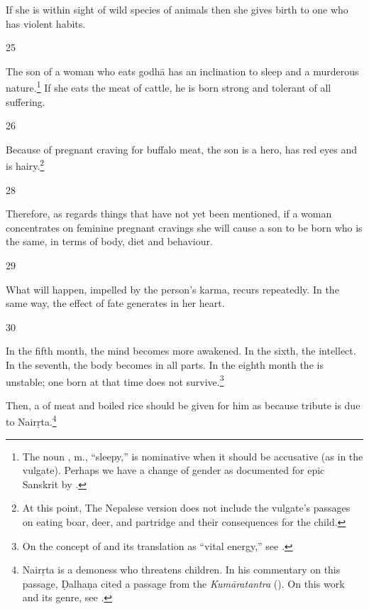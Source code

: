 \begin{translation}
If she is within sight of wild species of animals then she gives birth
to one who has violent habits.


\item [25]

The son of a woman who eats \gls{godhā} has an inclination to sleep
and a murderous nature.\footnote{The noun , m.,
    “sleepy,” is nominative when it should be accusative (as in the
    vulgate).  Perhaps we have a change of gender as documented for epic
    Sanskrit by \cite[xxxviii--xl, et passim]{ober-2003}.}  If she eats
    the meat of cattle, he is born strong and tolerant of all suffering.
    
\item [26] 
    
Because of pregnant craving for buffalo meat, the son is a hero, has red eyes and is 
hairy.\footnote{At this point, The Nepalese version does not include the vulgate's 
passages on eating boar, deer, and partridge and their consequences for the child.}

\item[28]

Therefore, as regards things that have not yet been mentioned, if a
woman concentrates on feminine  pregnant cravings she will cause a son to be 
born who is the same, in terms of body, diet and behaviour.

\item[29]

What will happen, impelled by the person's karma, recurs repeatedly.  In the same 
way, the effect of fate generates  in her heart. 

\item[30]

In the fifth month, the mind becomes more awakened. %
In the sixth, the intellect.  In the seventh, the body becomes
 in all parts. %
In the eighth month the  is unstable; one born
at that time does not survive.\footnote{On the concept of 
    and its translation as “vital energy,” see \cites[xl, et
    passim]{wuja-2003}[530--535]{das-2003}.} 

Then, a  of meat and boiled rice should be
given for him as  because tribute is due to
Nair\d{r}ta.\footnote{Nair\d{r}ta is a demoness who threatens
    children.  In his commentary on this passage, \d{D}alha\d{n}a cited a
    passage from the \emph{Kum\=aratantra} (\cite[353]{vulgate}).  On this
    work and its genre, see
    \cites[261--264]{wuja-1999}{bagc-1941}{fill-1937}.}


\end{translation}
